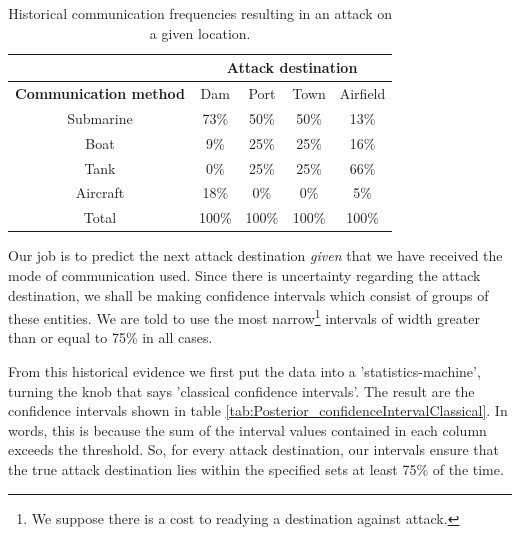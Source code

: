 \documentclass[11pt,fullpage]{book}
\begin{document}
\begin{table}[htbp]
  \centering
    \begin{tabular}{ccccc}
    \toprule
          & \multicolumn{4}{c}{\textbf{Attack destination}} \\
    \midrule
    \textbf{Communication method} & Dam & Port & Town & Airfield \\
    Submarine & 73\%  & 50\%  & 50\%  & 13\% \\
    Boat  & 9\%   & 25\%  & 25\%  & 16\% \\
    Tank  & 0\%   & 25\%  & 25\%  & 66\% \\
    Aircraft & 18\%   & 0\%  & 0\%   & 5\% \\
    \bottomrule
    Total & 100\% & 100\% & 100\% & 100\% \\
    \end{tabular}%
  \caption{Historical communication frequencies resulting in an attack on a given location.}\label{tab:Posterior_confidenceIntervalHistoric}
\end{table}%

Our job is to predict the next attack destination \textit{given} that we have received the mode of communication used. Since there is uncertainty regarding the attack destination, we shall be making confidence intervals which consist of groups of these entities. We are told to use the most narrow\footnote{We suppose there is a cost to readying a destination against attack.} intervals of width greater than or equal to 75\% in all cases.

From this historical evidence we first put the data into a 'statistics-machine', turning the knob that says 'classical confidence intervals'. The result are the confidence intervals shown in table \ref{tab:Posterior_confidenceIntervalClassical}. In words, this is because the sum of the interval values contained in each column exceeds the threshold. So, for every attack destination, our intervals ensure that the true attack destination lies within the specified sets at least 75\% of the time.
\end{document}
